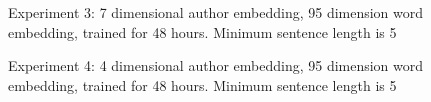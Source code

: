 \documentclass{article}%
\begin{document}
\begin{figure}
\noindent{}
\caption{Experiment 3: 7 dimensional author embedding, 95 dimension word embedding, trained for 48 hours. Minimum sentence length is 5}
\end{figure}
\begin{figure}
\noindent{}
\caption{Experiment 4: 4 dimensional author embedding, 95 dimension word embedding, trained for 48 hours. Minimum sentence length is 5}
\end{figure}
\end{document}
